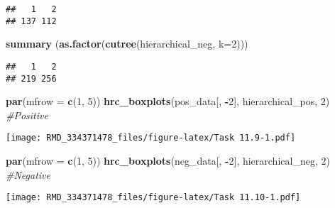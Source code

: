 \documentclass[
]{article}
\newenvironment{Shaded}{\begin{snugshade}}{\end{snugshade}}
\newcommand{\AttributeTok}[1]{\textcolor[rgb]{0.13,0.29,0.53}{#1}}
\newcommand{\CommentTok}[1]{\textcolor[rgb]{0.56,0.35,0.01}{\textit{#1}}}
\newcommand{\DecValTok}[1]{\textcolor[rgb]{0.00,0.00,0.81}{#1}}
\newcommand{\FunctionTok}[1]{\textcolor[rgb]{0.13,0.29,0.53}{\textbf{#1}}}
\newcommand{\NormalTok}[1]{#1}
\newcommand{\SpecialCharTok}[1]{\textcolor[rgb]{0.81,0.36,0.00}{\textbf{#1}}}
\begin{document}
\begin{verbatim}
##   1   2 
## 137 112
\end{verbatim}

\begin{Shaded}
\begin{Highlighting}[]
\FunctionTok{summary}\NormalTok{ (}\FunctionTok{as.factor}\NormalTok{(}\FunctionTok{cutree}\NormalTok{(hierarchical\_neg, }\AttributeTok{k=}\DecValTok{2}\NormalTok{)))}
\end{Highlighting}
\end{Shaded}

\begin{verbatim}
##   1   2 
## 219 256
\end{verbatim}

\begin{Shaded}
\begin{Highlighting}[]
\FunctionTok{par}\NormalTok{(}\AttributeTok{mfrow =} \FunctionTok{c}\NormalTok{(}\DecValTok{1}\NormalTok{, }\DecValTok{5}\NormalTok{))}
\FunctionTok{hrc\_boxplots}\NormalTok{(pos\_data[, }\SpecialCharTok{{-}}\DecValTok{2}\NormalTok{], hierarchical\_pos, }\DecValTok{2}\NormalTok{) }\CommentTok{\#Positive}
\end{Highlighting}
\end{Shaded}

\texttt{[image: RMD\_334371478\_files/figure-latex/Task 11.9-1.pdf]}

\begin{Shaded}
\begin{Highlighting}[]
\FunctionTok{par}\NormalTok{(}\AttributeTok{mfrow =} \FunctionTok{c}\NormalTok{(}\DecValTok{1}\NormalTok{, }\DecValTok{5}\NormalTok{))}
\FunctionTok{hrc\_boxplots}\NormalTok{(neg\_data[, }\SpecialCharTok{{-}}\DecValTok{2}\NormalTok{], hierarchical\_neg, }\DecValTok{2}\NormalTok{) }\CommentTok{\#Negative}
\end{Highlighting}
\end{Shaded}

\texttt{[image: RMD\_334371478\_files/figure-latex/Task 11.10-1.pdf]}
\end{document}
